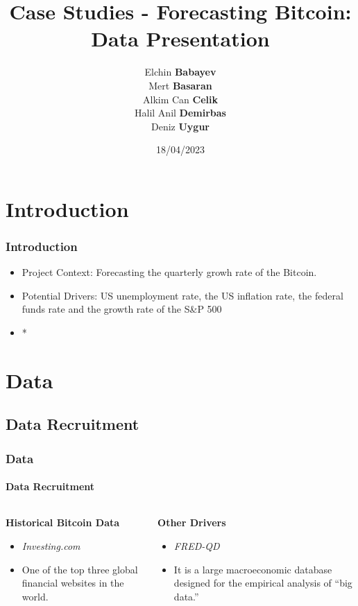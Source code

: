 \documentclass{beamer}
\title{Case Studies - Forecasting Bitcoin: \\Data Presentation}
\author{Elchin \textbf {Babayev}\\
Mert \textbf{Basaran}\\
Alkim Can \textbf{Celik}\\
Halil Anil \textbf{Demirbas}\\
Deniz \textbf{Uygur}}
\institute{Technische Universität Dortmund}
\date{18/04/2023}
\begin{document}
	\begin{frame}
		\titlepage %
	\end{frame}
	\section{Introduction}
	\begin{frame}
		\frametitle{Introduction}
		\begin{itemize}
			\item Project Context: Forecasting the quarterly growh rate of the Bitcoin.
			\item Potential Drivers: US unemployment rate, the US inflation rate, the federal funds rate and the growth rate of the S\&P 500
			\item *
		\end{itemize}
	\end{frame}
	\section{Data}
	\subsection{Data Recruitment}
		\begin{frame}
		\frametitle{Data}
		\framesubtitle{Data Recruitment}
			\begin{columns}
				\begin{column}{0.5\textwidth}
					\textbf{Historical Bitcoin Data}
					\begin{itemize}
						\item \emph {Investing.com}
						\item One of the top three global financial websites in the world.
					\end{itemize}
				\end{column}
				\begin{column}{0.5\textwidth}
					\textbf{Other Drivers}
				\begin{itemize}
					\item \emph{FRED-QD}
					\item It is a large macroeconomic database designed for the empirical analysis of “big data.”
				\end{itemize}
				\end{column}
		\end{columns}
	\end{frame}
\end{document}
